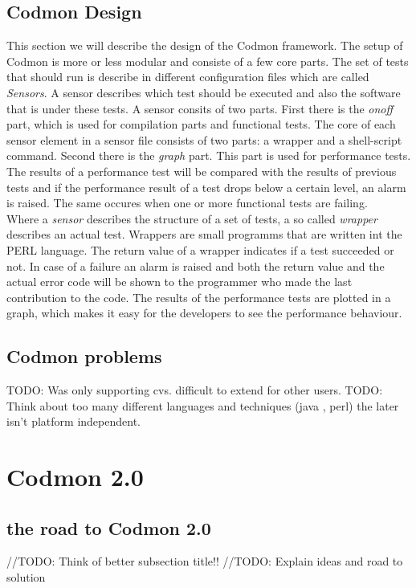 \documentclass[a4paper,10pt]{scrartcl}
\newcommand{\project}{Codmon 2.0}
\begin{document}
\subsection{Codmon Design}
\label{subsec:CodmonDesign}
This section we will describe the design of the Codmon framework. The setup of Codmon is more or less modular and consiste of a few core parts. The set of tests that should run is describe
in different configuration files which are called \emph{Sensors}. A sensor describes which test should be executed and also the software that is under these tests. A sensor consits of two
parts. First there is the \emph{onoff} part, which is used for compilation parts and functional tests. The core of each sensor element in a sensor file consists of two parts: a wrapper and
a shell-script command. Second there is the \emph{graph} part. This part is used for performance tests. The results of a performance test will be compared with the results of previous tests 
and if the performance result of a test drops below a certain level, an alarm is raised. The same occures when one or more functional tests are failing.\\

\noindent Where a \emph{sensor} describes the structure of a set of tests, a so called \emph{wrapper} describes an actual test. Wrappers are small programms that are written int the PERL
language. The return value of a wrapper indicates if a test succeeded or not. In case of a failure an alarm is raised and both the return value and the actual error code will be shown to
the programmer who made the last contribution to the code. The results of the performance tests are plotted in a graph, which makes it easy for the developers to see the performance
behaviour.

\subsection{Codmon problems}
\label{subsec:CodmonProblems}
TODO: Was only supporting cvs. difficult to extend for other users.
TODO: Think about too many different languages and techniques (java , perl) the later isn't platform independent.


\newpage
\section{\project{}}
\label{sec:Codmon2.0}

\subsection{the road to \project{}}
//TODO: Think of better subsection title!!
//TODO: Explain ideas and road to solution
\end{document}
